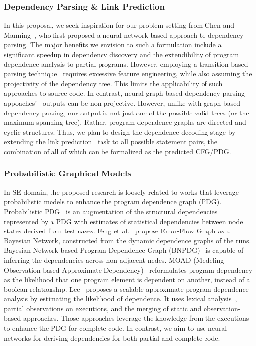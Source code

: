 \subsubsection{Dependency Parsing \& Link Prediction}
In this proposal, we seek inspiration for our problem setting from Chen and Manning~\cite{chen-manning-2014-fast}, who first proposed a neural network-based approach to dependency parsing. The major benefits we envision to such a formulation include a significant speedup in dependency discovery and the extendibility of program dependence analysis to partial programs. However, employing a transition-based parsing technique~\cite{chen-manning-2014-fast} requires excessive feature engineering, while also assuming the projectivity of the dependency tree. This limits the applicability of such approaches to source code. In contrast, neural graph-based dependency parsing appoaches'~\cite{kiperwasser-goldberg-2016-simple, DBLP:conf/iclr/DozatM17} outputs can be non-projective. However, unlike with graph-based dependency parsing, our output is not just one of the possible valid trees (or the maximum spanning tree). Rather, program dependence graphs are directed and cyclic structures. Thus, we plan to design the dependence decoding stage by extending the link prediction~\cite{10.5555/3327345.3327423} task to all possible statement pairs, the combination of all of which can be formalized as the predicted CFG/PDG.


\subsubsection{Probabilistic Graphical Models}
In SE domain, the proposed research is loosely related to works that leverage probabilistic models to enhance the program dependence graph (PDG). Probabilistic PDG~\cite{baah-issta08-probabilistic} is an augmentation of the structural dependencies represented by a PDG with estimates of statistical dependencies between node states derived from test cases. Feng et al.~\cite{feng-paste10} propose Error-Flow Graph as a Bayesian Network, constructed from the dynamic dependence graphs of the runs. Bayesian Network-based Program Dependence Graph (BNPDG)~\cite{yu-jss17-bayesian} is capable of inferring the dependencies across non-adjacent nodes. MOAD (Modeling Observation-based Approximate Dependency)~\cite{lee-scam19-moad} reformulates program dependency as the likelihood that one program element is dependent on another, instead of a boolean relationship.  Lee~\cite{lee-icse20} proposes a scalable approximate program dependence analysis by estimating the likelihood of dependence. It uses lexical analysis~\cite{lee-jss20}, partial observations on executions, and the merging of static and observation-based approaches. Those approaches leverage the knowledge from the executions to enhance the PDG for complete code. In contrast, we aim to use neural networks for deriving dependencies for both partial and complete code.
